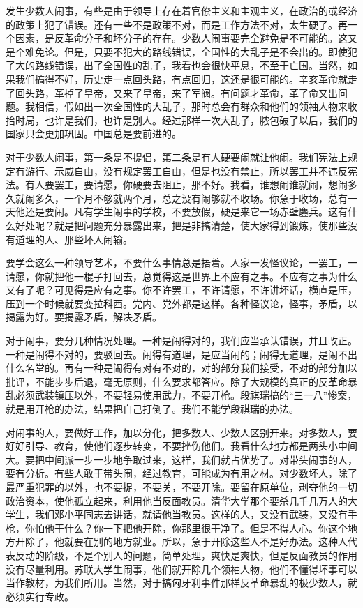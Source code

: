 发生少数人闹事，有些是由于领导上存在着官僚主义和主观主义，在政治的或经济的政策上犯了错误。还有一些不是政策不对，而是工作方法不对，太生硬了。再一个因素，是反革命分子和坏分子的存在。少数人闹事要完全避免是不可能的。这又是个难免论。但是，只要不犯大的路线错误，全国性的大乱子是不会出的。即使犯了大的路线错误，出了全国性的乱子，我看也会很快平息，不至于亡国。当然，如果我们搞得不好，历史走一点回头路，有点回归，这还是很可能的。辛亥革命就走了回头路，革掉了皇帝，又来了皇帝，来了军阀。有问题才革命，革了命又出问题。我相信，假如出一次全国性的大乱子，那时总会有群众和他们的领袖人物来收拾时局，也许是我们，也许是别人。经过那样一次大乱子，脓包破了以后，我们的国家只会更加巩固。中国总是要前进的。

对于少数人闹事，第一条是不提倡，第二条是有人硬要闹就让他闹。我们宪法上规定有游行、示威自由，没有规定罢工自由，但是也没有禁止，所以罢工并不违反宪法。有人要罢工，要请愿，你硬要去阻止，那不好。我看，谁想闹谁就闹，想闹多久就闹多久，一个月不够就两个月，总之没有闹够就不收场。你急于收场，总有一天他还是要闹。凡有学生闹事的学校，不要放假，硬是来它一场赤壁鏖兵。这有什么好处呢？就是把问题充分暴露出来，把是非搞清楚，使大家得到锻炼，使那些没有道理的人、那些坏人闹输。

要学会这么一种领导艺术，不要什么事情总是捂着。人家一发怪议论，一罢工，一请愿，你就把他一棍子打回去，总觉得这是世界上不应有之事。不应有之事为什么又有了呢？可见得是应有之事。你不许罢工，不许请愿，不许讲坏话，横直是压，压到一个时候就要变拉科西。党内、党外都是这样。各种怪议论，怪事，矛盾，以揭露为好。要揭露矛盾，解决矛盾。

对于闹事，要分几种情况处理。一种是闹得对的，我们应当承认错误，并且改正。一种是闹得不对的，要驳回去。闹得有道理，是应当闹的；闹得无道理，是闹不出什么名堂的。再有一种是闹得有对有不对的，对的部分我们接受，不对的部分加以批评，不能步步后退，毫无原则，什么要求都答应。除了大规模的真正的反革命暴乱必须武装镇压以外，不要轻易使用武力，不要开枪。段祺瑞搞的“三一八”惨案，就是用开枪的办法，结果把自己打倒了。我们不能学段祺瑞的办法。

对闹事的人，要做好工作，加以分化，把多数人、少数人区别开来。对多数人，要好好引导、教育，使他们逐步转变，不要挫伤他们。我看什么地方都是两头小中间大。要把中间派一步一步地争取过来，这样，我们就占优势了。对带头闹事的人，要有分析。有些人敢于带头闹，经过教育，可能成为有用之材。对少数坏人，除了最严重犯罪的以外，也不要捉，不要关，不要开除。要留在原单位，剥夺他的一切政治资本，使他孤立起来，利用他当反面教员。清华大学那个要杀几千几万人的大学生，我们邓小平同志去讲话，就请他当教员。这样的人，又没有武装，又没有手枪，你怕他干什么？你一下把他开除，你那里很干净了。但是不得人心。你这个地方开除了，他就要在别的地方就业。所以，急于开除这些人不是好办法。这种人代表反动的阶级，不是个别人的问题，简单处理，爽快是爽快，但是反面教员的作用没有尽量利用。苏联大学生闹事，他们就开除几个领袖人物，他们不懂得坏事可以当作教材，为我们所用。当然，对于搞匈牙利事件那样反革命暴乱的极少数人，就必须实行专政。

